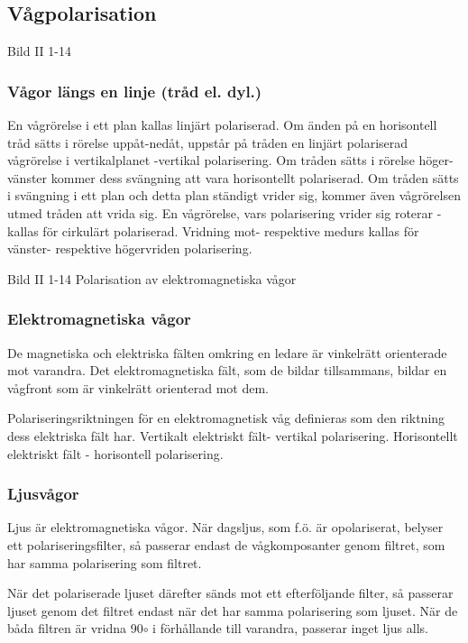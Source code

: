 \subsection{Vågpolarisation}

Bild II 1-14

\subsubsection{Vågor längs en linje (tråd el. dyl.)}
En vågrörelse i ett plan kallas linjärt polariserad. Om änden på en horisontell tråd sätts
i rörelse uppåt-nedåt, uppstår på tråden en linjärt polariserad vågrörelse i vertikalplanet
-vertikal polarisering.
Om tråden sätts i rörelse höger-vänster kommer dess svängning att vara horisontellt
polariserad.
Om tråden sätts i svängning i ett plan och detta plan ständigt vrider sig, kommer även
vågrörelsen utmed tråden att vrida sig. En vågrörelse, vars polarisering vrider sig
roterar - kallas för cirkulärt polariserad. Vridning mot- respektive medurs kallas för
vänster- respektive högervriden polarisering.

Bild II 1-14 Polarisation av elektromagnetiska vågor

\subsubsection{Elektromagnetiska vågor}

De magnetiska och elektriska fälten omkring en ledare är vinkelrätt orienterade mot
varandra. Det elektromagnetiska fält, som de bildar tillsammans, bildar en vågfront som är
vinkelrätt orienterad mot dem.

Polariseringsriktningen för en elektromagnetisk våg definieras som den riktning dess
elektriska fält har.
Vertikalt elektriskt fält- vertikal polarisering.
Horisontellt elektriskt fält - horisontell polarisering.

\subsubsection{Ljusvågor}

Ljus är elektromagnetiska vågor. När dagsljus, som f.ö. är opolariserat, belyser ett
polariseringsfilter, så passerar endast de vågkomposanter genom filtret, som har samma
polarisering som filtret.

När det polariserade ljuset därefter sänds mot ett efterföljande filter, så passerar ljuset
genom det filtret endast när det har samma polarisering som ljuset. När de båda filtren är
vridna 90$\circ$ i förhållande till varandra, passerar inget ljus alls.

